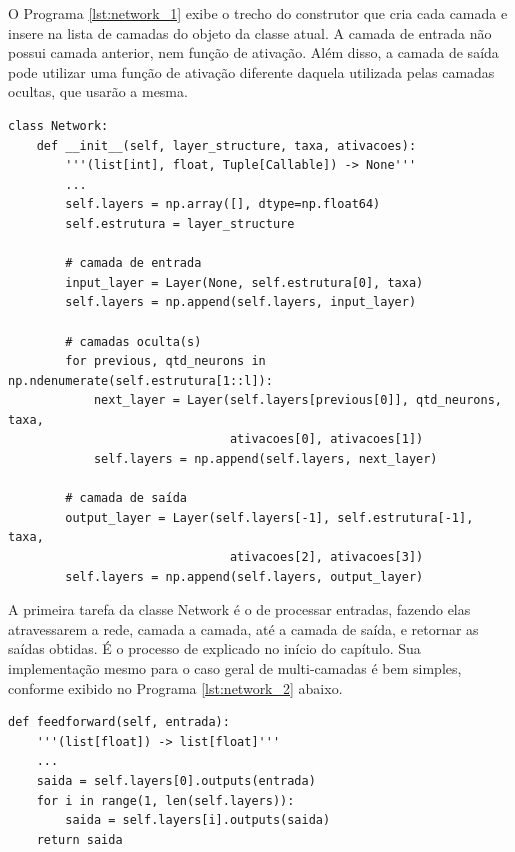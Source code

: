 O Programa \ref{lst:network_1} exibe o trecho do construtor que cria cada camada e insere na lista de camadas do objeto da classe atual. A camada de entrada não possui camada anterior, nem função de ativação. Além disso, a camada de saída pode utilizar uma função de ativação diferente daquela utilizada pelas camadas ocultas, que usarão a mesma.
\newline
\estiloR
\begin{lstlisting}[caption={Trecho da classe \eng{Network}}, label={lst:network_1}, escapeinside={\%}]
class Network:
    def __init__(self, layer_structure, taxa, ativacoes):
        '''(list[int], float, Tuple[Callable]) -> None'''
        ...
        self.layers = np.array([], dtype=np.float64)
        self.estrutura = layer_structure

        # camada de entrada
        input_layer = Layer(None, self.estrutura[0], taxa)
        self.layers = np.append(self.layers, input_layer)

        # camadas oculta(s)
        for previous, qtd_neurons in np.ndenumerate(self.estrutura[1::l]):
            next_layer = Layer(self.layers[previous[0]], qtd_neurons, taxa,
                               ativacoes[0], ativacoes[1])
            self.layers = np.append(self.layers, next_layer)

        # camada de saída
        output_layer = Layer(self.layers[-1], self.estrutura[-1], taxa,
                               ativacoes[2], ativacoes[3])
        self.layers = np.append(self.layers, output_layer)
\end{lstlisting}


A primeira tarefa da classe Network é o de processar entradas, fazendo elas atravessarem a rede, camada a camada, até a camada de saída, e retornar as saídas obtidas. É o processo de  explicado no início do capítulo. Sua implementação mesmo para o caso geral de multi-camadas é bem simples, conforme exibido no Programa \ref{lst:network_2} abaixo.
\newpage
\estiloR
\begin{lstlisting}[caption={Trecho da classe \eng{Network}}, label={lst:network_2}, escapeinside={\%}]
def feedforward(self, entrada):
    '''(list[float]) -> list[float]'''
    ...
    saida = self.layers[0].outputs(entrada)
    for i in range(1, len(self.layers)):
        saida = self.layers[i].outputs(saida)
    return saida
\end{lstlisting}


